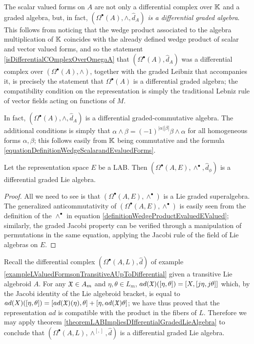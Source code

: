 \begin{example}
The scalar valued forms on $A$ are not only a differential complex over $\mathbb{K}$ and a graded algebra, but, in fact, \textit{$(\Omega^\bullet(A), \wedge, \hat d_A)$ is a differential graded algebra}. This follows from noticing that the wedge product associated to the algebra multiplication of $\mathbb{K}$ coincides with the already defined wedge product of scalar and vector valued forms, and so the statement \ref{isDifferentialCOmplexOverOmegaA} that $(\Omega^\bullet(A), \hat d_A)$ was a differential complex over $(\Omega^\bullet(A), \wedge)$, together with the graded Leibniz that accompanies it, is precisely the statement that $\Omega^\bullet(A)$ is a differential graded algebra; the compatibility condition on the representation is simply the traditional Lebniz rule of vector fields acting on functions of $M$.

In fact, $(\Omega^\bullet(A), \wedge, \hat d_A)$ is a differential graded-commutative algebra. The additional conditions is simply that $\alpha \wedge \beta = (-1)^{|\alpha||\beta|}\beta \wedge \alpha$ for all homogeneous forms $\alpha, \beta$; this follows easily from $\mathbb{K}$ being commutative and the formula \eqref{equationDefinitionWedgeScalarandEvaluedForms}.
\end{example}

\begin{theorem}\label{theoremLABImpliesDIfferentialGradedLieAlgebra}
Let the representation space $E$ be a LAB. Then $(\Omega^\bullet(A, E), \wedge^\bullet, \hat d_\phi)$ is a differential graded Lie algebra.
\end{theorem}
\begin{proof}
All we need to see is that $(\Omega^\bullet(A, E), \wedge^\bullet)$ is a Lie graded superalgebra. The generalized anticommutativity of $(\Omega^\bullet(A, E), \wedge^\bullet)$ is easily seen from the definition of the $\wedge^\bullet$ in equation \eqref{definitionWedgeProductEvaluedEValued}; similarly, the graded Jacobi property can be verified through a manipulation of permutations in the same equation, applying the Jacobi rule of the field of Lie algebras on $E$. 
\end{proof}

\begin{example}\label{exampleOmegaALIsDIfferentialGradedLieAlgebra}
Recall the differential complex $(\Omega^\bullet(A, L), \hat d)$ of example \ref{exampleLValuedFormsonTransitiveAUpToDifferential} given a transitive Lie algebroid $A$. For any $\mathfrak{X} \in A_m$ and $\eta, \theta \in L_m$, $ad(\mathfrak{X})([\eta, \theta]) = [X, [j\eta, j\theta]]$ which, by the Jacobi identity of the Lie algebroid bracket, is equal to $ad(X)([\eta, \theta]) = [ad(\mathfrak{X})(\eta), \theta] + [\eta, ad(\mathfrak{X}) \theta]$; we have thus proved that the representation $ad$ is compatible with the product in the fibers of $L$. Therefore we may apply theorem \ref{theoremLABImpliesDIfferentialGradedLieAlgebra} to conclude that $(\Omega^\bullet(A, L), \wedge^{[,]}, \hat d)$ is a differential graded Lie algebra.
\end{example}

